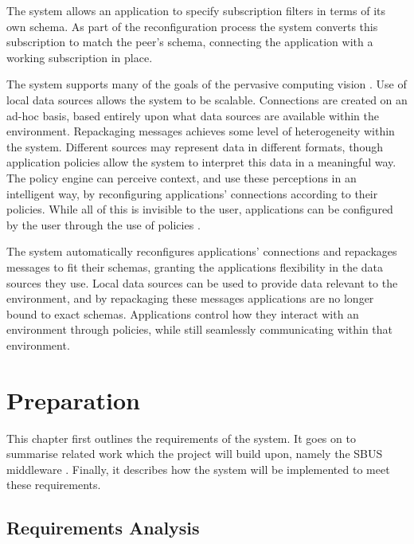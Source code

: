 \documentclass[12pt,twoside,notitlepage]{report}
\begin{document}
The system allows an application to specify subscription filters in terms of its own schema. 
As part of the reconfiguration process the system converts this subscription to match the peer's schema, connecting the application with a working subscription in place.

The system supports many of the goals of the pervasive computing vision \cite{weiser1991computer}.
Use of local data sources allows the system to be scalable. 
Connections are created on an ad-hoc basis, based entirely upon what data sources are available within the environment. 
Repackaging messages achieves some level of heterogeneity within the system. 
Different sources may represent data in different formats, though application policies allow the system to interpret this data in a meaningful way. 
The policy engine can perceive context, and use these perceptions in an intelligent way, by reconfiguring applications' connections according to their policies. 
While all of this is invisible to the user, applications can be configured by the user through the use of policies \cite{saha2003pervasive}.

The system automatically reconfigures applications' connections and repackages messages to fit their schemas, granting the applications flexibility in the data sources they use.
Local data sources can be used to provide data relevant to the environment, and by repackaging these messages applications are no longer bound to exact schemas. 
Applications control how they interact with an environment through policies, while still seamlessly communicating within that environment.

\cleardoublepage

 
\chapter{Preparation}

This chapter first outlines the requirements of the system. 
It goes on to summarise related work which the project will build upon, namely the SBUS middleware \cite{ingram2009reconfigurable}. 
Finally, it describes how the system will be implemented to meet these requirements.


\section{Requirements Analysis}
\end{document}
